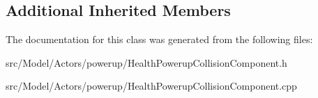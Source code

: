 \subsection*{Additional Inherited Members}


The documentation for this class was generated from the following files\+:\begin{DoxyCompactItemize}
\item 
src/\+Model/\+Actors/powerup/Health\+Powerup\+Collision\+Component.\+h\item 
src/\+Model/\+Actors/powerup/Health\+Powerup\+Collision\+Component.\+cpp\end{DoxyCompactItemize}

